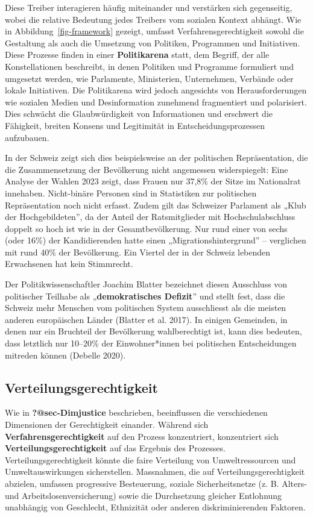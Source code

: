 \documentclass[
  nswissgerman,
  a4paper,
  DIV=11,
  numbers=noendperiod,
  oneside,
  openany]{scrreprt}
\begin{document}
Diese Treiber interagieren häufig miteinander und verstärken sich
gegenseitig, wobei die relative Bedeutung jedes Treibers vom sozialen
Kontext abhängt. Wie in Abbildung~\ref{fig-framework} gezeigt, umfasst
Verfahrensgerechtigkeit sowohl die Gestaltung als auch die Umsetzung von
Politiken, Programmen und Initiativen. Diese Prozesse finden in einer
\textbf{Politikarena} statt, dem Begriff, der alle Konstellationen
beschreibt, in denen Politiken und Programme formuliert und umgesetzt
werden, wie Parlamente, Ministerien, Unternehmen, Verbände oder lokale
Initiativen. Die Politikarena wird jedoch angesichts von
Herausforderungen wie sozialen Medien und Desinformation zunehmend
fragmentiert und polarisiert. Dies schwächt die Glaubwürdigkeit von
Informationen und erschwert die Fähigkeit, breiten Konsens und
Legitimität in Entscheidungsprozessen aufzubauen.

In der Schweiz zeigt sich dies beispielsweise an der politischen
Repräsentation, die die Zusammensetzung der Bevölkerung nicht angemessen
widerspiegelt: Eine Analyse der Wahlen 2023 zeigt, dass Frauen nur
37,8\% der Sitze im Nationalrat innehaben. Nicht-binäre Personen sind in
Statistiken zur politischen Repräsentation noch nicht erfasst. Zudem
gilt das Schweizer Parlament als „Klub der Hochgebildeten'', da der
Anteil der Ratsmitglieder mit Hochschulabschluss doppelt so hoch ist wie
in der Gesamtbevölkerung. Nur rund einer von sechs (oder 16\%) der
Kandidierenden hatte einen „Migrationshintergrund'' -- verglichen mit
rund 40\% der Bevölkerung. Ein Viertel der in der Schweiz lebenden
Erwachsenen hat kein Stimmrecht.

Der Politikwissenschaftler Joachim Blatter bezeichnet diesen Ausschluss
von politischer Teilhabe als „\textbf{demokratisches Defizit}'' und
stellt fest, dass die Schweiz mehr Menschen vom politischen System
ausschliesst als die meisten anderen europäischen Länder (Blatter et al.
2017). In einigen Gemeinden, in denen nur ein Bruchteil der Bevölkerung
wahlberechtigt ist, kann dies bedeuten, dass letztlich nur 10--20\% der
Einwohner*innen bei politischen Entscheidungen mitreden können (Debelle
2020).

\subsection{Verteilungsgerechtigkeit}\label{verteilungsgerechtigkeit}

Wie in \textbf{?@sec-Dimjustice} beschrieben, beeinflussen die
verschiedenen Dimensionen der Gerechtigkeit einander. Während sich
\textbf{Verfahrensgerechtigkeit} auf den Prozess konzentriert,
konzentriert sich \textbf{Verteilungsgerechtigkeit} auf das Ergebnis des
Prozesses. Verteilungsgerechtigkeit könnte die faire Verteilung von
Umweltressourcen und Umweltauswirkungen sicherstellen. Massnahmen, die
auf Verteilungsgerechtigkeit abzielen, umfassen progressive Besteuerung,
soziale Sicherheitsnetze (z. B. Alters- und Arbeitslosenversicherung)
sowie die Durchsetzung gleicher Entlohnung unabhängig von Geschlecht,
Ethnizität oder anderen diskriminierenden Faktoren.
\end{document}
